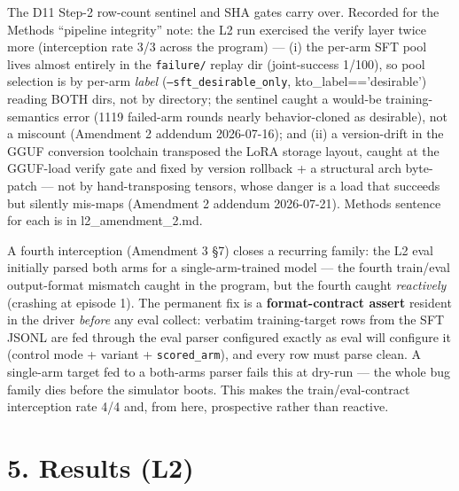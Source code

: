 The D11 Step-2 row-count sentinel and SHA gates carry over. Recorded for
the Methods ``pipeline integrity'' note: the L2 run exercised the verify
layer twice more (interception rate 3/3 across the program) ---
(i) the per-arm SFT pool lives almost entirely in the \texttt{failure/} replay
dir (joint-success 1/100), so pool selection is by per-arm \emph{label}
(\texttt{--sft\_desirable\_only}, kto\_label=='desirable') reading BOTH dirs, not by
directory; the sentinel caught a would-be training-semantics error (1119
failed-arm rounds nearly behavior-cloned as desirable), not a miscount
(Amendment 2 addendum 2026-07-16); and (ii) a version-drift in the GGUF
conversion toolchain transposed the LoRA storage layout, caught at the
GGUF-load verify gate and fixed by version rollback + a structural arch
byte-patch --- not by hand-transposing tensors, whose danger is a load that
succeeds but silently mis-maps (Amendment 2 addendum 2026-07-21). Methods
sentence for each is in l2\_amendment\_2.md.

A fourth interception (Amendment 3 \S7) closes a recurring family: the L2
eval initially parsed both arms for a single-arm-trained model --- the
fourth train/eval output-format mismatch caught in the program, but the
fourth caught \emph{reactively} (crashing at episode 1). The permanent fix is
a \textbf{format-contract assert} resident in the driver \emph{before} any eval
collect: verbatim training-target rows from the SFT JSONL are fed through
the eval parser configured exactly as eval will configure it (control
mode + variant + \texttt{scored\_arm}), and every row must parse clean. A
single-arm target fed to a both-arms parser fails this at dry-run --- the
whole bug family dies before the simulator boots. This makes the
train/eval-contract interception rate 4/4 and, from here, prospective
rather than reactive.

\section*{5. Results (L2)}


